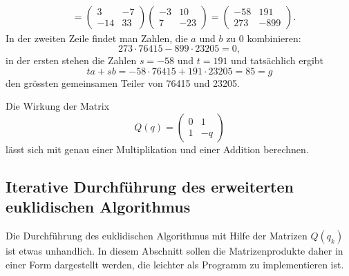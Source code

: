 \begin{beispiel}
\begin{align*}
{}_{}
\\ &=
\begin{pmatrix}  3 &  -7 \\ -14 &  33 \end{pmatrix}
\begin{pmatrix} -3 &  10 \\   7 & -23 \end{pmatrix}
=
\begin{pmatrix} -58 & 191 \\ 273 & -899 \end{pmatrix}.
\end{align*}
In der zweiten Zeile findet man Zahlen, die $a$ und $b$ zu 0 kombinieren:
\[
273 \cdot 76415 - 899 \cdot 23205 = 0,
\]
in der ersten stehen die Zahlen $s=-58$ und $t=191$ und tatsächlich
ergibt
\[
ta+sb = -58\cdot 76415  + 191\cdot 23205 = 85 = g
\]
den grössten gemeinsamen Teiler von 76415 und 23205.
\end{beispiel}

Die Wirkung der Matrix
\[
Q(q) = \begin{pmatrix} 0 & 1 \\ 1 & -q \end{pmatrix}
\]
lässt sich mit genau einer Multiplikation und einer Addition
berechnen.

%
%
\subsection{Iterative Durchführung des erweiterten euklidischen Algorithmus
\label{buch:endlichekoerper:subsection:erweitertereuklidischeralgo}}
Die Durchführung des euklidischen Algorithmus mit Hilfe der Matrizen
$Q(q_k)$ ist etwas unhandlich.
In diesem Abschnitt sollen die Matrizenprodukte daher in einer Form
dargestellt werden, die leichter als Programm zu implementieren ist.

